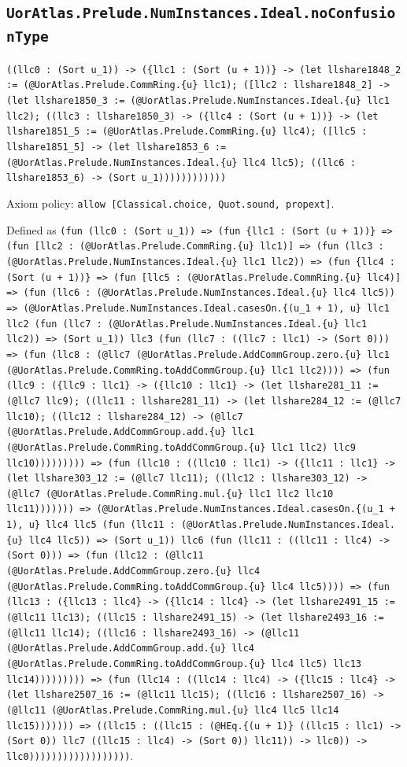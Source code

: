 \documentclass[11pt]{article}
\begin{document}
\subsection*{\texttt{UorAtlas.Prelude.NumInstances.Ideal.noConfusionType}}
\noindent\texttt{((llc0 : (Sort u\_1)) -> (\{llc1 : (Sort (u + 1))\} -> (let llshare1848\_2 := (@UorAtlas.Prelude.CommRing.\{u\} llc1); ([llc2 : llshare1848\_2] -> (let llshare1850\_3 := (@UorAtlas.Prelude.NumInstances.Ideal.\{u\} llc1 llc2); ((llc3 : llshare1850\_3) -> (\{llc4 : (Sort (u + 1))\} -> (let llshare1851\_5 := (@UorAtlas.Prelude.CommRing.\{u\} llc4); ([llc5 : llshare1851\_5] -> (let llshare1853\_6 := (@UorAtlas.Prelude.NumInstances.Ideal.\{u\} llc4 llc5); ((llc6 : llshare1853\_6) -> (Sort u\_1))))))))))))}\par
\noindent Axiom policy: \texttt{allow [Classical.choice, Quot.sound, propext]}.\par
\noindent Defined as \texttt{(fun (llc0 : (Sort u\_1)) => (fun \{llc1 : (Sort (u + 1))\} => (fun [llc2 : (@UorAtlas.Prelude.CommRing.\{u\} llc1)] => (fun (llc3 : (@UorAtlas.Prelude.NumInstances.Ideal.\{u\} llc1 llc2)) => (fun \{llc4 : (Sort (u + 1))\} => (fun [llc5 : (@UorAtlas.Prelude.CommRing.\{u\} llc4)] => (fun (llc6 : (@UorAtlas.Prelude.NumInstances.Ideal.\{u\} llc4 llc5)) => (@UorAtlas.Prelude.NumInstances.Ideal.casesOn.\{(u\_1 + 1), u\} llc1 llc2 (fun (llc7 : (@UorAtlas.Prelude.NumInstances.Ideal.\{u\} llc1 llc2)) => (Sort u\_1)) llc3 (fun (llc7 : ((llc7 : llc1) -> (Sort 0))) => (fun (llc8 : (@llc7 (@UorAtlas.Prelude.AddCommGroup.zero.\{u\} llc1 (@UorAtlas.Prelude.CommRing.toAddCommGroup.\{u\} llc1 llc2)))) => (fun (llc9 : (\{llc9 : llc1\} -> (\{llc10 : llc1\} -> (let llshare281\_11 := (@llc7 llc9); ((llc11 : llshare281\_11) -> (let llshare284\_12 := (@llc7 llc10); ((llc12 : llshare284\_12) -> (@llc7 (@UorAtlas.Prelude.AddCommGroup.add.\{u\} llc1 (@UorAtlas.Prelude.CommRing.toAddCommGroup.\{u\} llc1 llc2) llc9 llc10))))))))) => (fun (llc10 : ((llc10 : llc1) -> (\{llc11 : llc1\} -> (let llshare303\_12 := (@llc7 llc11); ((llc12 : llshare303\_12) -> (@llc7 (@UorAtlas.Prelude.CommRing.mul.\{u\} llc1 llc2 llc10 llc11))))))) => (@UorAtlas.Prelude.NumInstances.Ideal.casesOn.\{(u\_1 + 1), u\} llc4 llc5 (fun (llc11 : (@UorAtlas.Prelude.NumInstances.Ideal.\{u\} llc4 llc5)) => (Sort u\_1)) llc6 (fun (llc11 : ((llc11 : llc4) -> (Sort 0))) => (fun (llc12 : (@llc11 (@UorAtlas.Prelude.AddCommGroup.zero.\{u\} llc4 (@UorAtlas.Prelude.CommRing.toAddCommGroup.\{u\} llc4 llc5)))) => (fun (llc13 : (\{llc13 : llc4\} -> (\{llc14 : llc4\} -> (let llshare2491\_15 := (@llc11 llc13); ((llc15 : llshare2491\_15) -> (let llshare2493\_16 := (@llc11 llc14); ((llc16 : llshare2493\_16) -> (@llc11 (@UorAtlas.Prelude.AddCommGroup.add.\{u\} llc4 (@UorAtlas.Prelude.CommRing.toAddCommGroup.\{u\} llc4 llc5) llc13 llc14))))))))) => (fun (llc14 : ((llc14 : llc4) -> (\{llc15 : llc4\} -> (let llshare2507\_16 := (@llc11 llc15); ((llc16 : llshare2507\_16) -> (@llc11 (@UorAtlas.Prelude.CommRing.mul.\{u\} llc4 llc5 llc14 llc15))))))) => ((llc15 : ((llc15 : (@HEq.\{(u + 1)\} ((llc15 : llc1) -> (Sort 0)) llc7 ((llc15 : llc4) -> (Sort 0)) llc11)) -> llc0)) -> llc0))))))))))))))))))}.\par
\end{document}
